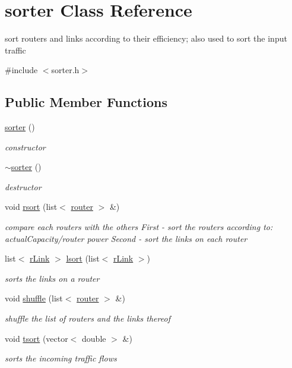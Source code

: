 \hypertarget{classsorter}{\section{sorter \-Class \-Reference}
\label{classsorter}
}


sort routers and links according to their efficiency; also used to sort the input traffic  




{\ttfamily \#include $<$sorter.\-h$>$}

\subsection*{\-Public \-Member \-Functions}
\begin{DoxyCompactItemize}
\item 
\hyperlink{classsorter_a0ff82eecc48ab163c3286cee244b7d92}{sorter} ()
\begin{DoxyCompactList}\small\item\em constructor \end{DoxyCompactList}\item 
\hyperlink{classsorter_a27f9666807092c172a5ad6f0048d2b57}{$\sim$sorter} ()
\begin{DoxyCompactList}\small\item\em destructor \end{DoxyCompactList}\item 
void \hyperlink{classsorter_aa5c4e14df085599365f57f144ffb25be}{rsort} (list$<$ \hyperlink{classrouter}{router} $>$ \&)
\begin{DoxyCompactList}\small\item\em compare each routers with the others \-First -\/ sort the routers according to\-: actual\-Capacity/router power \-Second -\/ sort the links on each router \end{DoxyCompactList}\item 
list$<$ \hyperlink{classrLink}{r\-Link} $>$ \hyperlink{classsorter_a8c6f644537f597bc5ab57e2012655754}{lsort} (list$<$ \hyperlink{classrLink}{r\-Link} $>$)
\begin{DoxyCompactList}\small\item\em sorts the links on a router \end{DoxyCompactList}\item 
void \hyperlink{classsorter_a4b7e91f19fb0bcb73c1e32d168353b40}{shuffle} (list$<$ \hyperlink{classrouter}{router} $>$ \&)
\begin{DoxyCompactList}\small\item\em shuffle the list of routers and the links thereof \end{DoxyCompactList}\item 
void \hyperlink{classsorter_ae5717a09e1732631a6edcf122f2498c5}{tsort} (vector$<$ double $>$ \&)
\begin{DoxyCompactList}\small\item\em sorts the incoming traffic flows \end{DoxyCompactList}\end{DoxyCompactItemize}


